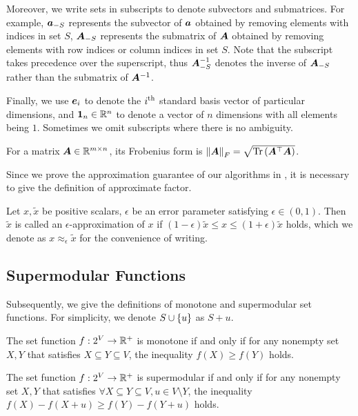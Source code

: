 \documentclass[sigconf]{acmart}
\begin{document}
Moreover, we write sets in subscripts to denote subvectors and submatrices.
For example, \(\boldsymbol{a}_{-S}\) represents the subvector of \(\boldsymbol{a}\) obtained by removing elements with indices in set \(S\), \(\boldsymbol{A}_{-S}\) represents the submatrix of \(\boldsymbol{A}\) obtained by removing elements with row indices or column indices in set \(S\).
Note that the subscript takes precedence over the superscript, thus \(\boldsymbol{A}_{-S}^{-1}\) denotes the inverse of \(\boldsymbol{A}_{-S}\) rather than the submatrix of \(\boldsymbol{A}^{-1}\).

Finally, we use \(\boldsymbol{e}_i\) to denote the \({i}^{\rm{th}}\) standard basis vector of particular dimensions, and \(\boldsymbol{1}_n\in \mathbb{R}^n\) to denote a vector of \(n\) dimensions with all elements being \(1\).
Sometimes we omit subscripts where there is no ambiguity.

For a matrix \(\boldsymbol{A}\in\mathbb{R}^{m\times n}\), its Frobenius form is \(\left\Vert\boldsymbol{A}\right\Vert_F=\sqrt{\mathrm{Tr}\left(\boldsymbol{A}^\top\boldsymbol{A}\right)}\).

Since we prove the approximation guarantee of our algorithms in , it is necessary to give the definition of approximate factor.

\begin{definition}
    Let \(x,\tilde{x}\) be positive scalars, \(\epsilon\) be an error parameter satisfying \(\epsilon\in(0,1)\).
    Then \(\tilde{x}\) is called an \(\epsilon\)-approximation of \(x\) if \((1-\epsilon)\tilde{x}\le x\le(1+\epsilon)\tilde{x}\) holds, which we denote as \(x\approx_{\epsilon}\tilde{x}\) for the convenience of writing.
\end{definition}

\subsection{Supermodular Functions}

Subsequently, we give the definitions of monotone and supermodular set functions. For simplicity, we denote \(S\cup\left\{u \right\}\) as \(S+u\).

\begin{definition}[Monotonicity]
    The set function \(f:2^{V}\to\mathbb{R}^+\) is monotone if and only if for any nonempty set \(X,Y\) that satisfies \(X\subseteq Y\subseteq V\), the inequality \(f(X)\ge f(Y)\) holds.
\end{definition}

\begin{definition}[Supermodularity]
    The set function \(f:2^{V}\to\mathbb{R}^+\) is supermodular if and only if for any nonempty set \(X,Y\) that satisfies \(\forall X\subseteq Y\subseteq V, u\in V\setminus Y\), the inequality \(f(X)-f(X+u)\ge f(Y)-f(Y+u)\) holds.
\end{definition}
\end{document}
